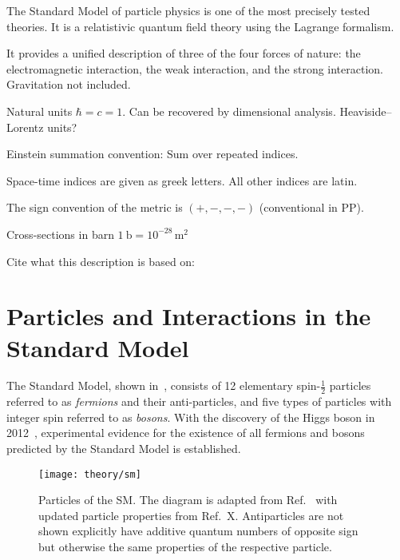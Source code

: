 The Standard Model of particle physics is one of the most precisely tested
theories. It is a relatistivic quantum field theory using the Lagrange
formalism.

It provides a unified description of three of the four forces of nature: the
electromagnetic interaction, the weak interaction, and the strong
interaction. Gravitation not included.

Natural units $\hbar = c = 1$. Can be recovered by dimensional
analysis. Heaviside--Lorentz units?

Einstein summation convention: Sum over repeated indices.

Space-time indices are given as greek letters. All other indices are latin.

The sign convention of the metric is $(+, -, -, -)$ (conventional in PP).

Cross-sections in barn $\SI{1}{\barn} = 10^{-28}\,\si{\metre\squared}$

Cite what this description is based on: \cite{Halzen:1984mc,Thomson:2013zua}


\section{Particles and Interactions in the Standard Model}

The Standard Model, shown in~, consists of 12 elementary
spin-$\frac{1}{2}$ particles referred to as \emph{fermions} and their
anti-particles, and five types of particles with integer spin referred to as
\emph{bosons}. With the discovery of the Higgs boson in
2012~\cite{HIGG-2012-27,CMS-HIG-12-028}, experimental evidence for the existence
of all fermions and bosons predicted by the Standard Model is established.

\begin{figure}[htbp]
  \centering

  \texttt{[image: theory/sm]}

  \caption{Particles of the SM. The diagram is adapted from Ref.~\cite{sm_tikz}
    with updated particle properties from Ref.~X. Antiparticles are not shown
    explicitly have additive quantum numbers of opposite sign but otherwise the
    same properties of the respective particle.}
  \label{fig:sm_particles}
\end{figure}


